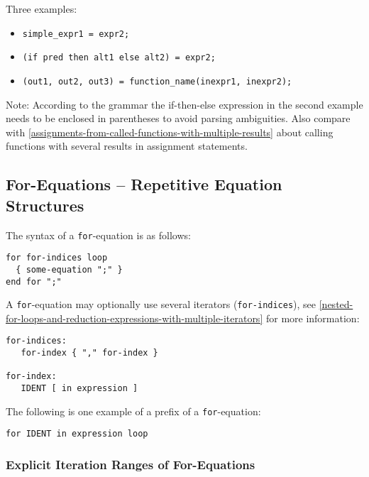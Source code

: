 Three examples:
\begin{itemize}
\item \lstinline!simple_expr1 = expr2;!
\item \lstinline!(if pred then alt1 else alt2) = expr2;!
\item \lstinline!(out1, out2, out3) = function_name(inexpr1, inexpr2);!
\end{itemize}

\begin{nonnormative}
Note: According to the grammar the if-then-else expression in the second example needs to be enclosed in parentheses to avoid parsing ambiguities.
Also compare with \cref{assignments-from-called-functions-with-multiple-results} about calling functions with several results in assignment statements.
\end{nonnormative}

\subsection{For-Equations -- Repetitive Equation Structures}\label{for-equations-repetitive-equation-structures}

The syntax of a \lstinline!for!-equation is as follows:
\begin{lstlisting}[language=grammar]
for for-indices loop
  { some-equation ";" }
end for ";"
\end{lstlisting}

A \lstinline!for!-equation may optionally use several iterators (\lstinline[language=grammar]!for-indices!), see \cref{nested-for-loops-and-reduction-expressions-with-multiple-iterators} for more information:
\begin{lstlisting}[language=grammar]
for-indices:
   for-index { "," for-index }

for-index:
   IDENT [ in expression ]
\end{lstlisting}

The following is one example of a prefix of a \lstinline!for!-equation:
\begin{lstlisting}[language=grammar]
for IDENT in expression loop
\end{lstlisting}

\subsubsection{Explicit Iteration Ranges of For-Equations}\label{explicit-iteration-ranges-of-for-equations}

